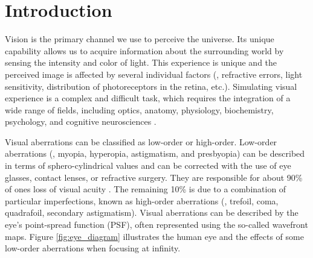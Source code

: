 
\chapter{Introduction}
\label{chap:Introduction}

Vision is the primary channel we use to perceive the universe. Its unique capability allows us to acquire information about the surrounding world by sensing the intensity and color of light. This experience is unique and the perceived image is affected by several individual factors (\eg, refractive errors, light sensitivity, distribution of photoreceptors in the retina, etc.). Simulating visual experience is a complex and difficult task, which requires the integration of a wide range of fields, including optics, anatomy, physiology, biochemistry, psychology, and cognitive neurosciences \cite{Schwartz2010}. 

Visual aberrations can be classified as low-order or high-order. Low-order aberrations (\ie, myopia, hyperopia, astigmatism, and presbyopia) can be described in terms of sphero-cylindrical values and can be corrected with the use of eye glasses, contact lenses, or refractive surgery.  They are responsible for about 90\% of ones loss of visual acuity \cite{Dias2014}. The remaining 10\% is due to a combination of particular imperfections, known as high-order aberrations (\eg, trefoil, coma, quadrafoil, secondary astigmatism). Visual aberrations can be described by the eye's point-spread function (PSF), often represented using the so-called wavefront maps. Figure \ref{fig:eye_diagram} illustrates the human eye and the effects of some low-order aberrations when focusing at infinity. 


